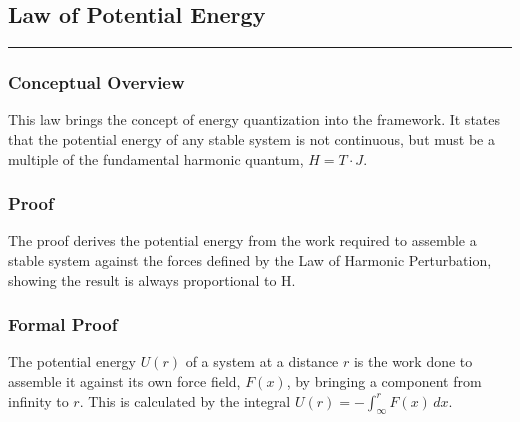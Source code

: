 
\subsection*{Law of Potential Energy}
\hrule
\vspace{0.3cm}
\vspace{0.5cm}

\subsubsection*{Conceptual Overview}
This law brings the concept of energy quantization into the framework. It states that the potential energy of any stable system is not continuous, but must be a multiple of the fundamental harmonic quantum, $H = T \cdot J$.

\subsubsection*{Proof}
The proof derives the potential energy from the work required to assemble a stable system against the forces defined by the Law of Harmonic Perturbation, showing the result is always proportional to H.

\subsubsection*{Formal Proof}
The potential energy $U(r)$ of a system at a distance $r$ is the work done to assemble it against its own force field, $F(x)$, by bringing a component from infinity to $r$. This is calculated by the integral $U(r) = -\int_{\infty}^{r} F(x) \,dx$.

